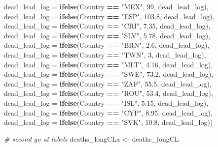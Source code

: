 \documentclass[
]{article}
\newenvironment{Shaded}{\begin{snugshade}}{\end{snugshade}}
\newcommand{\CommentTok}[1]{\textcolor[rgb]{0.56,0.35,0.01}{\textit{#1}}}
\newcommand{\DataTypeTok}[1]{\textcolor[rgb]{0.13,0.29,0.53}{#1}}
\newcommand{\DecValTok}[1]{\textcolor[rgb]{0.00,0.00,0.81}{#1}}
\newcommand{\FloatTok}[1]{\textcolor[rgb]{0.00,0.00,0.81}{#1}}
\newcommand{\KeywordTok}[1]{\textcolor[rgb]{0.13,0.29,0.53}{\textbf{#1}}}
\newcommand{\NormalTok}[1]{#1}
\newcommand{\OperatorTok}[1]{\textcolor[rgb]{0.81,0.36,0.00}{\textbf{#1}}}
\newcommand{\StringTok}[1]{\textcolor[rgb]{0.31,0.60,0.02}{#1}}
\begin{document}
\begin{Shaded}
\begin{Highlighting}[]
{{         \DataTypeTok{dead_lead_log =} \KeywordTok{ifelse}\NormalTok{(Country }\OperatorTok{==}\StringTok{ "MEX"}\NormalTok{, }\DecValTok{99}\NormalTok{, dead_lead_log),}
         \DataTypeTok{dead_lead_log =} \KeywordTok{ifelse}\NormalTok{(Country }\OperatorTok{==}\StringTok{ "ESP"}\NormalTok{, }\FloatTok{103.8}\NormalTok{, dead_lead_log),}
         \DataTypeTok{dead_lead_log =} \KeywordTok{ifelse}\NormalTok{(Country }\OperatorTok{==}\StringTok{ "CRI"}\NormalTok{, }\FloatTok{7.35}\NormalTok{, dead_lead_log),}
         \DataTypeTok{dead_lead_log =} \KeywordTok{ifelse}\NormalTok{(Country }\OperatorTok{==}\StringTok{ "SLV"}\NormalTok{, }\FloatTok{5.78}\NormalTok{, dead_lead_log),}
         \DataTypeTok{dead_lead_log =} \KeywordTok{ifelse}\NormalTok{(Country }\OperatorTok{==}\StringTok{ "BRN"}\NormalTok{, }\FloatTok{2.6}\NormalTok{, dead_lead_log),}
         \DataTypeTok{dead_lead_log =} \KeywordTok{ifelse}\NormalTok{(Country }\OperatorTok{==}\StringTok{ "TWN"}\NormalTok{, }\DecValTok{3}\NormalTok{, dead_lead_log),}
         \DataTypeTok{dead_lead_log =} \KeywordTok{ifelse}\NormalTok{(Country }\OperatorTok{==}\StringTok{ "MLT"}\NormalTok{, }\FloatTok{4.16}\NormalTok{, dead_lead_log),}
         \DataTypeTok{dead_lead_log =} \KeywordTok{ifelse}\NormalTok{(Country }\OperatorTok{==}\StringTok{ "SWE"}\NormalTok{, }\FloatTok{73.2}\NormalTok{, dead_lead_log),}
         \DataTypeTok{dead_lead_log =} \KeywordTok{ifelse}\NormalTok{(Country }\OperatorTok{==}\StringTok{ "ZAF"}\NormalTok{, }\FloatTok{55.5}\NormalTok{, dead_lead_log),}
          \DataTypeTok{dead_lead_log =} \KeywordTok{ifelse}\NormalTok{(Country }\OperatorTok{==}\StringTok{ "ROU"}\NormalTok{, }\FloatTok{53.4}\NormalTok{, dead_lead_log),}
         \DataTypeTok{dead_lead_log =} \KeywordTok{ifelse}\NormalTok{(Country }\OperatorTok{==}\StringTok{ "ISL"}\NormalTok{, }\FloatTok{5.15}\NormalTok{, dead_lead_log),}
         \DataTypeTok{dead_lead_log =} \KeywordTok{ifelse}\NormalTok{(Country }\OperatorTok{==}\StringTok{ "CYP"}\NormalTok{, }\FloatTok{8.95}\NormalTok{, dead_lead_log),}
         \DataTypeTok{dead_lead_log =} \KeywordTok{ifelse}\NormalTok{(Country }\OperatorTok{==}\StringTok{ "SVK"}\NormalTok{, }\FloatTok{10.8}\NormalTok{, dead_lead_log))}

\CommentTok{# second go at labels}
\NormalTok{deaths_longCLa <-}\StringTok{ }\NormalTok{deaths_longCL}


}}
\end{Highlighting}
\end{Shaded}
\end{document}
